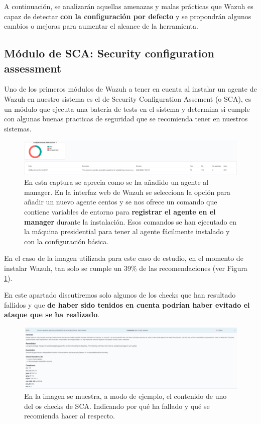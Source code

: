 A continuación, se analizarán aquellas amenazas y malas prácticas que Wazuh es capaz de detectar \textbf{con la configuración por defecto} y se propondrán algunos cambios o mejoras para aumentar el alcance de la herramienta.


\subsection{Módulo de SCA: Security configuration assessment}

Uno de los primeros módulos de Wazuh a tener en cuenta al instalar un agente de Wazuh en nuestro sistema es el de Security Configuration Assement (o SCA), es un módulo que ejecuta una batería de tests en el sistema y determina si cumple con algunas buenas practicas de seguridad que se recomienda tener en nuestros sistemas.


\begin{figure}[!hbt]
  \centering
  \includegraphics[width=\textwidth]{imagenes/sca.png}
  \caption{En esta captura se aprecia como se ha añadido un agente al manager. En la interfaz web de Wazuh se selecciona la opción para añadir un nuevo agente centos y se nos ofrece un comando que contiene variables de entorno para \textbf{registrar el agente en el manager} durante la instalación. Esos comandos se han ejecutado en la máquina presidential para tener al agente fácilmente instalado y con la configuración básica.}
   \label{sca}
\end{figure}

En el caso de la imagen utilizada para este caso de estudio, en el momento de instalar Wazuh, tan solo se cumple un 39\% de las recomendaciones (ver Figura \ref{sca}).

En este apartado discutiremos solo algunos de los checks que han resultado fallidos y que \textbf{de haber sido tenidos en cuenta podrían haber evitado el ataque que se ha realizado}.


\begin{figure}[!hbt]
  \centering
  \includegraphics[width=\textwidth]{imagenes/sca_check1.png}
  \caption{En la imagen se muestra, a modo de ejemplo, el contenido de uno del os checks de SCA. Indicando por qué ha fallado y qué se recomienda hacer al respecto.}
   \label{sca_check1}
\end{figure}


